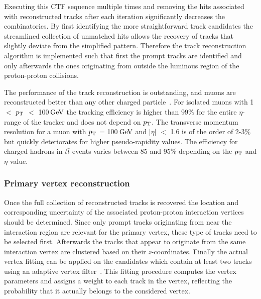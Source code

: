 Executing this CTF sequence multiple times and removing the hits associated with reconstructed tracks after each iteration significantly decreases the combinatorics. %
By first identifying the more straightforward track candidates the streamlined collection of unmatched hits allows the recovery of tracks that slightly deviate from the simplified pattern. 
Therefore the track reconstruction algorithm is implemented such that first the prompt tracks are identified and only afterwards the ones originating from outside the luminous region of the proton-proton collisions.

The performance of the track reconstruction is outstanding, and muons are reconstructed better than any other charged particle~\cite{TrackAndPVReco}. For isolated muons with 1 $<$ $p_{\rm T}$ $<$ 100$\, \mathrm{GeV}$ the tracking efficiency is higher than 99$\%$ for the entire $\eta$-range of the tracker and does not depend on $p_{\rm T}$. The transverse momentum resolution for a muon with $p_{\rm T}$ = 100$\, \mathrm{GeV}$ and $\vert \eta \vert$ $<$ 1.6 is of the order of 2-3$\%$ but quickly deteriorates for higher pseudo-rapidity values.
The efficiency for charged hadrons in $t\bar{t}$ events varies between 85 and 95$\%$ depending on the $p_{\rm T}$ and $\eta$ value. %

\subsubsection*{Primary vertex reconstruction}
Once the full collection of reconstructed tracks is recovered the location and corresponding uncertainty of the associated proton-proton interaction vertices should be determined. Since only prompt tracks originating from near the interaction region are relevant for the primary vertex, these type of tracks need to be selected first. Afterwards the tracks that appear to originate from the same interaction vertex are clustered based on their $z$-coordinates. Finally the actual vertex fitting can be applied on the candidates which contain at least two tracks using an adaptive vertex filter~\cite{AdaptiveVertexFitting}. This fitting procedure computes the vertex parameters and assigns a weight to each track in the vertex, reflecting the probability that it actually belongs to the considered vertex.
\\

